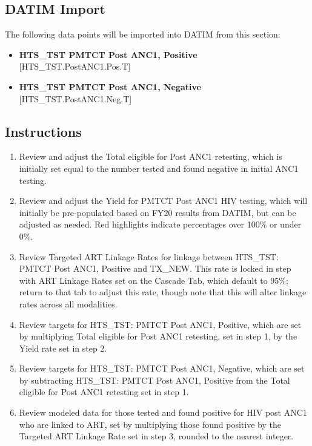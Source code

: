\documentclass[
  openany]{book}
\begin{document}
\hypertarget{datim-import-13}{%
\subsection{DATIM Import}\label{datim-import-13}}

The following data points will be imported into DATIM from this section:

\begin{itemize}
\item
  \textbf{HTS\_TST PMTCT Post ANC1, Positive} {[}HTS\_TST.PostANC1.Pos.T{]}
\item
  \textbf{HTS\_TST PMTCT Post ANC1, Negative} {[}HTS\_TST.PostANC1.Neg.T{]}
\end{itemize}

\hypertarget{instructions-13}{%
\subsection{Instructions}\label{instructions-13}}

\begin{enumerate}
\def\labelenumi{\arabic{enumi}.}
\item
  Review and adjust the Total eligible for Post ANC1 retesting, which
  is initially set equal to the number tested and found negative in
  initial ANC1 testing.
\item
  Review and adjust the Yield for PMTCT Post ANC1 HIV testing, which
  will initially be pre-populated based on FY20 results from DATIM,
  but can be adjusted as needed. Red highlights indicate percentages
  over 100\% or under 0\%.
\item
  Review Targeted ART Linkage Rates for linkage between HTS\_TST: PMTCT
  Post ANC1, Positive and TX\_NEW. This rate is locked in step with ART
  Linkage Rates set on the Cascade Tab, which default to 95\%; return
  to that tab to adjust this rate, though note that this will alter
  linkage rates across all modalities.
\item
  Review targets for HTS\_TST: PMTCT Post ANC1, Positive, which are set
  by multiplying Total eligible for Post ANC1 retesting, set in step
  1, by the Yield rate set in step 2.
\item
  Review targets for HTS\_TST: PMTCT Post ANC1, Negative, which are set
  by subtracting HTS\_TST: PMTCT Post ANC1, Positive from the Total
  eligible for Post ANC1 retesting set in step 1.
\item
  Review modeled data for those tested and found positive for HIV post
  ANC1 who are linked to ART, set by multiplying those found positive
  by the Targeted ART Linkage Rate set in step 3, rounded to the
  nearest integer.\textbf{\hfill\break
  }
\end{enumerate}
\end{document}

